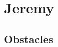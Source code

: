 \documentclass[onecolumn, draftclsnofoot,10pt, compsoc]{IEEEtran}
\begin{document}

\section{Jeremy}
 
    \subsection{Obstacles}
\end{document}
